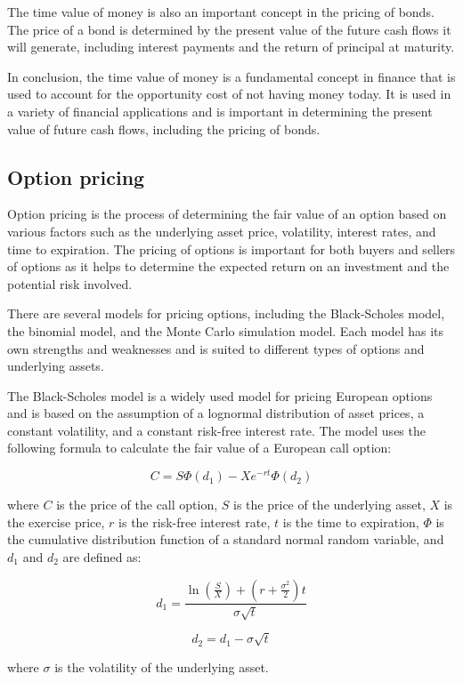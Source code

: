 \documentclass[12pt, a4paper, oneside]{article}
\begin{document}
The time value of money is also an important concept in the pricing of bonds. The price of a bond is determined by the present value of the future cash flows it will generate, including interest payments and the return of principal at maturity.

In conclusion, the time value of money is a fundamental concept in finance that is used to account for the opportunity cost of not having money today. It is used in a variety of financial applications and is important in determining the present value of future cash flows, including the pricing of bonds.




\subsection{ Option pricing }
Option pricing is the process of determining the fair value of an option based on various factors such as the underlying asset price, volatility, interest rates, and time to expiration. The pricing of options is important for both buyers and sellers of options as it helps to determine the expected return on an investment and the potential risk involved.

There are several models for pricing options, including the Black-Scholes model, the binomial model, and the Monte Carlo simulation model. Each model has its own strengths and weaknesses and is suited to different types of options and underlying assets.

The Black-Scholes model is a widely used model for pricing European options and is based on the assumption of a lognormal distribution of asset prices, a constant volatility, and a constant risk-free interest rate. The model uses the following formula to calculate the fair value of a European call option:

$$C = S\Phi(d_1) - Xe^{-rt}\Phi(d_2)$$

where $C$ is the price of the call option, $S$ is the price of the underlying asset, $X$ is the exercise price, $r$ is the risk-free interest rate, $t$ is the time to expiration, $\Phi$ is the cumulative distribution function of a standard normal random variable, and $d_1$ and $d_2$ are defined as:

$$d_1 = \frac{\ln(\frac{S}{X}) + (r + \frac{\sigma^2}{2})t}{\sigma \sqrt{t}}$$

$$d_2 = d_1 - \sigma \sqrt{t}$$

where $\sigma$ is the volatility of the underlying asset.
\end{document}
